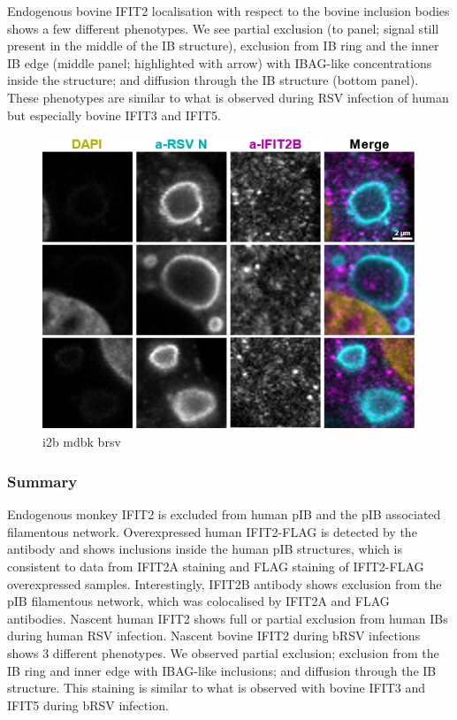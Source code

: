 Endogenous bovine IFIT2 localisation with respect to the bovine inclusion bodies shows a few different phenotypes. We see partial exclusion (to panel; signal still present in the middle of the IB structure), exclusion from IB ring and the inner IB edge (middle panel; highlighted with arrow) with IBAG-like concentrations inside the structure; and diffusion through the IB structure (bottom panel). These phenotypes are similar to what is observed during RSV infection of human but especially bovine IFIT3 and IFIT5.

\begin{figure}
    \centering
    \includegraphics[width=1\linewidth]{10. Chapter 5//Figs//02. I2B/06. i2b mdbk brsv.png}
    \caption[i2b mdbk brsv]{i2b mdbk brsv}
    \label{fig:i2b mdbk brsv}
\end{figure}

\subsubsection{Summary} \label{Summary-i2b}
Endogenous monkey IFIT2 is excluded from human pIB and the pIB associated filamentous network. Overexpressed human IFIT2-FLAG is detected by the antibody and shows inclusions inside the human pIB structures, which is consistent to data from IFIT2A staining and FLAG staining of IFIT2-FLAG overexpressed samples. Interestingly, IFIT2B antibody shows exclusion from the pIB filamentous network, which was colocalised by IFIT2A and FLAG antibodies. Nascent human IFIT2 shows full or partial exclusion from human IBs during human RSV infection. Nascent bovine IFIT2 during bRSV infections shows 3 different phenotypes. We observed partial exclusion; exclusion from the IB ring and inner edge with IBAG-like inclusions; and diffusion through the IB structure. This staining is similar to what is observed with bovine IFIT3 and IFIT5 during bRSV infection.